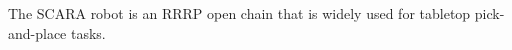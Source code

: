 \documentclass[preview]{standalone}
\begin{document}
\begin{center}
The SCARA robot is an RRRP open chain that is widely used for tabletop pick-and-place tasks.
\end{center}
\end{document}
